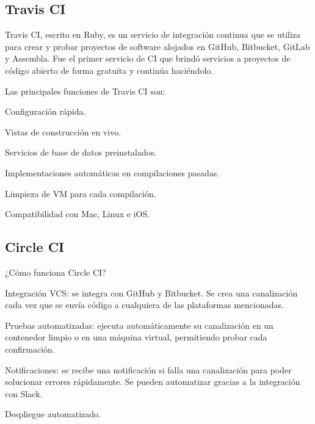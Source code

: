\subsection{Travis CI}
Travis CI, escrito en Ruby, es un servicio de integración continua que se utiliza para crear y probar proyectos de software alojados en GitHub, Bitbucket, GitLab y Assembla. Fue el primer servicio de CI que brindó servicios a proyectos de código abierto de forma gratuita y continúa haciéndolo.

Las principales funciones de Travis CI son:
\begin{compactitem}
    \item Configuración rápida.
    \item Vistas de construcción en vivo.
    \item Servicios de base de datos preinstalados.
    \item Implementaciones automáticas en compilaciones pasadas.
    \item Limpieza de VM para cada compilación.
    \item Compatibilidad con Mac, Linux e iOS.
\end{compactitem}

\subsection{Circle CI}
¿Cómo funciona Circle CI?
\begin{compactitem}
    \item Integración VCS: se integra con GitHub y Bitbucket. Se crea una canalización cada vez que se envía código a cualquiera de las plataformas mencionadas.
    \item Pruebas automatizadas: ejecuta automáticamente su canalización en un contenedor limpio o en una máquina virtual, permitiendo probar cada confirmación.
    \item Notificaciones: se recibe una notificación si falla una canalización para poder solucionar errores rápidamente. Se pueden automatizar gracias a la integración con Slack.
    \item Despliegue automatizado.
\end{compactitem}

